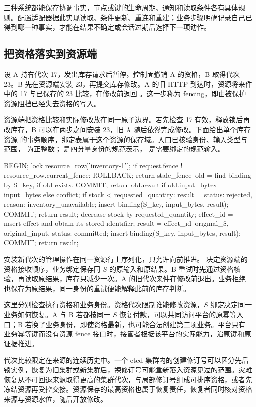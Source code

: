 三种系统都能保存协调事实，节点或键的生命周期、通知和读取条件各有具体规则。配置适配器据此实现读取、条件更新、重连和重建；业务步骤明确记录自己已得到哪一种事实，才能在结果不确定或会话过期后选择下一项动作。

\subsection*{把资格落实到资源端}

设 A 持有代次 17，发出库存请求后暂停。控制面撤销 A 的资格，B 取得代次 23。B 先在资源端安装 23，再提交库存修改。A 的旧 HTTP 到达时，资源将来件中的 17 与已保存的 23 比较，在修改前返回 。这一步称为 fencing，即由被保护资源阻挡已经失去资格的写入。


资源端把资格比较和实际修改放在同一原子边界。若先检查 17 有效，释放锁后再改库存，B 可以在两步之间安装 23，旧 A 随后依然完成修改。下面给出单个库存资源  的事务顺序，绑定表属于这个资源的保存域。入口已核验身份、输入类型与范围， 为正整数； 是四分量身份的规范表示， 是需要绑定的规范输入。

\begin{BookCode}
BEGIN;
lock resource_row('inventory-1');
if request.fence != resource_row.current_fence:
    ROLLBACK; return stale_fence;
old = find binding by S_key;
if old exists:
    COMMIT;
    return old.result if old.input_bytes == input_bytes else conflict;
if stock < requested_quantity:
    result = {status: rejected, reason: inventory_unavailable};
    insert binding(S_key, input_bytes, result);
    COMMIT; return result;
decrease stock by requested_quantity;
effect_id = insert effect and obtain its stored identifier;
result = {effect_id, original_S, original_input, status: committed};
insert binding(S_key, input_bytes, result);
COMMIT;
return result;
\end{BookCode}

安装新代次的管理操作在同一资源行上序列化，只允许向前推进。 决定资源端的资格接收顺序，业务绑定保存同 $S$ 的原输入和原结果。B 重试时先通过资格核验，再读取原结果，库存只减少一次。A 的旧代次来件在修改前退出。业务拒绝也保存为原结果，同一身份的重试便能解释此前的库存判断。

这里分别检查执行资格和业务身份。资格代次限制谁能修改资源，$S$ 绑定决定同一业务如何恢复。A 与 B 若都按同一 $S$ 恢复付款，可以共同访问平台的原幂等入口；B 若换了业务身份，即使资格最新，也可能合法创建第二项业务。平台只有业务幂等键而没有资源 fence 接口时，接管者根据该平台的实际能力，沿原键和原证据推进。


代次比较限定在来源的连续历史中。一个 etcd 集群内的创建修订号可以区分先后锁实例，恢复为旧集群或新集群后，裸修订号可能重新落入资源见过的范围。灾难恢复从不可回退来源取得更高的集群代次，与局部修订号组成可排序资格，或者先冻结资源再受控交接。资源保存的最高资格也属于恢复责任，恢复者同时核对资格来源与资源水位，随后开放修改。
\FloatBarrier
